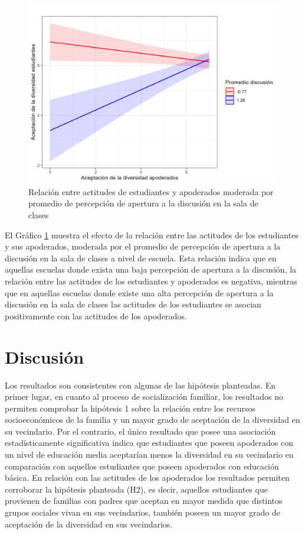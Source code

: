 \documentclass[12pt,twoside]{templates/facsothesis}
\begin{document}
\begin{figure}[!ht]

{\centering \includegraphics[width=1\linewidth,]{IPO/output/graphs/interac} 

}

\caption{Relación entre actitudes de estudiantes y apoderados moderada por promedio de percepción de apertura a la discusión en la sala de clases}\label{fig:graph-interact}
\end{figure}

El Gráfico \ref{fig:graph-interact} muestra el efecto de la relación entre las actitudes de los estudiantes y sus apoderados, moderada por el promedio de percepción de apertura a la discusión en la sala de clases a nivel de escuela. Esta relación indica que en aquellas escuelas donde exista una baja percepción de apertura a la discusión, la relación entre las actitudes de los estudiantes y apoderados es negativa, mientras que en aquellas escuelas donde existe una alta percepción de apertura a la discusión en la sala de clases las actitudes de los estudiantes se asocian positivamente con las actitudes de los apoderados.

\hypertarget{discusiuxf3n}{%
\chapter{Discusión}\label{discusiuxf3n}}

Los resultados son consistentes con algunas de las hipótesis planteadas. En primer lugar, en cuanto al proceso de socialización familiar, los resultados no permiten comprobar la hipótesis 1 sobre la relación entre los recursos socioeconómicos de la familia y un mayor grado de aceptación de la diversidad en su vecindario. Por el contrario, el único resultado que posee una asociación estadísticamente significativa indica que estudiantes que poseen apoderados con un nivel de educación media aceptarían menos la diversidad en su vecindario en comparación con aquellos estudiantes que poseen apoderados con educación básica. En relación con las actitudes de los apoderados los resultados permiten corroborar la hipótesis planteada (H2), es decir, aquellos estudiantes que provienen de familias con padres que aceptan en mayor medida que distintos grupos sociales vivan en sus vecindarios, también poseen un mayor grado de aceptación de la diversidad en sus vecindarios.
\end{document}

